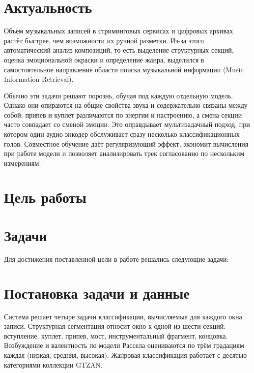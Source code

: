 \documentclass[master,summary]{pmk-graduate}
\begin{document}

\maketitlepage

\section{Актуальность}

Объём музыкальных записей в стриминговых сервисах и цифровых архивах растёт
быстрее, чем возможности их ручной разметки. Из-за этого автоматический анализ
композиций, то есть выделение структурных секций, оценка эмоциональной окраски
и определение жанра, выделился в самостоятельное направление области поиска
музыкальной информации (Music Information Retrieval).

Обычно эти задачи решают порознь, обучая под каждую отдельную модель. Однако они
опираются на общие свойства звука и содержательно связаны между собой: припев и
куплет различаются по энергии и настроению, а смена секции часто совпадает со
сменой эмоции. Это оправдывает мультизадачный подход, при котором один
аудио-энкодер обслуживает сразу несколько классификационных голов. Совместное
обучение даёт регуляризующий эффект, экономит вычисления при работе модели и
позволяет анализировать трек согласованно по нескольким измерениям.

\section{Цель работы}

\goalname

\section{Задачи}

Для достижения поставленной цели в работе решались следующие задачи:
\begin{enumerate}
\let\task\tasktask
\tasksname
\end{enumerate}

\section{Постановка задачи и данные}

Система решает четыре задачи классификации, вычисляемые для каждого окна записи.
Структурная сегментация относит окно к одной из шести секций: вступление, куплет,
припев, мост, инструментальный фрагмент, концовка. Возбуждение и валентность по
модели Рассела оцениваются по трём градациям каждая (низкая, средняя, высокая).
Жанровая классификация работает с десятью категориями коллекции GTZAN.
\end{document}

